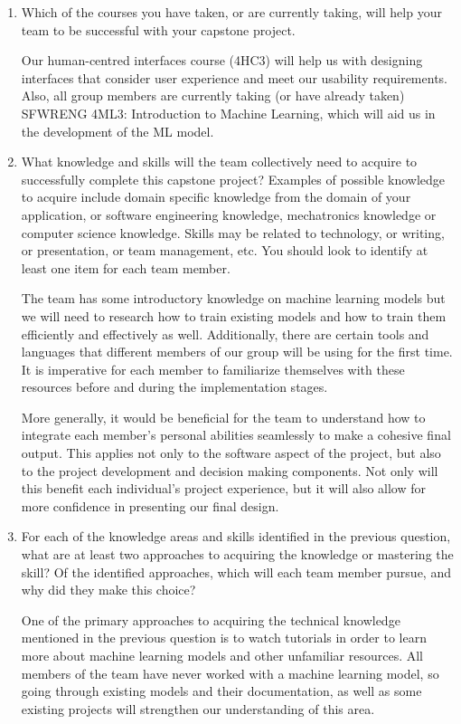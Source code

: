 \documentclass[12pt]{article}
\begin{document}
\begin{enumerate}
  \item Which of the courses you have taken, or are currently taking, will help
  your team to be successful with your capstone project.

  Our human-centred interfaces course (4HC3) will help us with designing interfaces that consider user experience and meet our usability requirements. Also, all group members are currently taking (or have already taken) SFWRENG 4ML3: Introduction to Machine Learning, which will aid us in the development of the ML model. 

  \item What knowledge and skills will the team collectively need to acquire to
  successfully complete this capstone project?  Examples of possible knowledge
  to acquire include domain specific knowledge from the domain of your
  application, or software engineering knowledge, mechatronics knowledge or
  computer science knowledge.  Skills may be related to technology, or writing,
  or presentation, or team management, etc.  You should look to identify at
  least one item for each team member.

  The team has some introductory knowledge on machine learning models but we
  will need to research how to train existing models and how to train them
  efficiently and effectively as well. Additionally, there are certain tools and
  languages that different members of our group will be using for the first
  time. It is imperative for each member to familiarize themselves with these
  resources before and during the implementation stages.

  More generally, it would be beneficial for the team to understand how to
  integrate each member’s personal abilities seamlessly to make a cohesive final
  output. This applies not only to the software aspect of the project, but also
  to the project development and decision making components. Not only will this
  benefit each individual’s project experience, but it will also allow for more
  confidence in presenting our final design. 
  

  \item For each of the knowledge areas and skills identified in the previous
  question, what are at least two approaches to acquiring the knowledge or
  mastering the skill?  Of the identified approaches, which will each team
  member pursue, and why did they make this choice?

One of the primary approaches to acquiring the technical knowledge mentioned in
the previous question is to watch tutorials in order to learn more about machine
learning models and other unfamiliar resources. All members of the team have
never worked with a machine learning model, so going through existing models and
their documentation, as well as some existing projects will strengthen our
understanding of this area. 


\end{enumerate}
\end{document}
